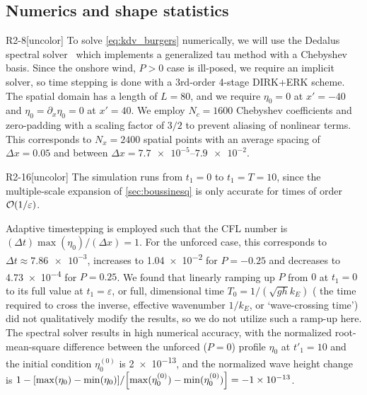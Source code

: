 \documentclass{jfm}
\renewcommand*{\epsilon}{\varepsilon}
\begin{document}
\subsection{\label{sec:numerics} Numerics and shape statistics}
\begin{LineLabel}{R2-8}[uncolor]
To solve \cref{eq:kdv_burgers} numerically, we will use the Dedalus
spectral solver~\citep{burns2020dedalus} which implements a generalized
tau method with a Chebyshev basis.
Since the onshore wind, $P>0$ case is ill-posed, we require an implicit
solver, so time stepping is done with a 3rd-order 4-stage DIRK+ERK
scheme.
The spatial domain has a length of $L=80$, and we require $\eta_0 = 0$
at $x' = -40$ and $\eta_0 = \partial_x \eta_0 = 0$ at $x' = 40$.
We employ $N_c = 1600$ Chebyshev coefficients and zero-padding with a
scaling factor of $3/2$ to prevent aliasing of nonlinear terms.
This corresponds to $N_x = 2400$ spatial points with an average spacing
of $\Delta x = 0.05$ and between $\Delta x = \numrange{7.7e-5}{7.9e-2}$.
\begin{LineLabel}{R2-16}[uncolor]
The simulation runs from $t_1 = 0$ to $t_1 = T = 10$, since the
multiple-scale expansion of \cref{sec:boussinesq} is only accurate for
times of order $\order{1/\epsilon}$.
\end{LineLabel}
Adaptive timestepping is employed such that the CFL number is $(\Delta
t) \max(\eta_0)/(\Delta x) = 1$.
For the unforced case, this corresponds to $\Delta t \approx
\num{7.86e-3}$, increases to \num{1.04e-2} for $P=-0.25$ and
decreases to \num{4.73e-4} for $P = 0.25$.
We found that linearly ramping up $P$ from $0$ at $t_1=0$ to its full
value at $t_1 = \epsilon$, or full, dimensional time $T_0 = 1/(\sqrt{gh}
k_E)$ (\ie{} the time required to cross the inverse, effective
wavenumber $1/k_E$, or `wave-crossing time') did not qualitatively
modify the results, so we do not utilize such a ramp-up here.
The spectral solver results in high numerical accuracy, with the
normalized root-mean-square difference between the unforced ($P=0$)
profile $\eta_0$ at $t'_1=10$ and the initial condition $\eta^{(0)}_0$
is \num{2e-13}, and the normalized wave height change is
$1-\bqty{\max(\eta_0) - \min(\eta_0)}/\allowbreak
\bqty{\max(\eta^{(0)}_0) - \min(\eta^{(0)}_0)} = \num{-1e-13}$.
\end{LineLabel}
\end{document}

